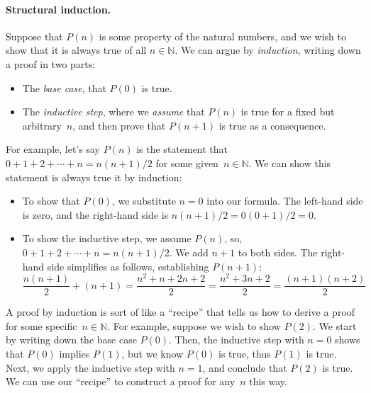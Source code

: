 \documentclass[../generics]{subfiles}
\begin{document}
\paragraph{Structural induction.} Suppose that $P(n)$ is some property of the natural numbers, and we wish to show that it is always true of all $n\in\mathbb{N}$. We can argue by \emph{induction}, writing down a proof in two parts:
\begin{itemize}
\item The \emph{base case}, that $P(0)$ is true.
\item The \emph{inductive step}, where we \emph{assume} that $P(n)$ is true for a fixed but arbitrary~$n$, and then prove that $P(n+1)$ is true as a consequence.
\end{itemize}
For example, let's say $P(n)$ is the statement that $0+1+2+\cdots+n=n(n+1)/2$ for some given~$n\in\mathbb{N}$. We can show this statement is always true it by induction:
\begin{itemize}
\item To show that $P(0)$, we substitute $n=0$ into our formula. The left-hand side is zero, and the right-hand side is $n(n+1)/2=0(0+1)/2=0$.
\item To show the inductive step, we assume $P(n)$, so, $0+1+2+\cdots+n=n(n+1)/2$. We add $n+1$ to both sides. The right-hand side simplifies as follows, establishing $P(n+1)$:
\[\frac{n(n+1)}{2}+(n+1)=\frac{n^2+n+2n+2}{2}=\frac{n^2+3n+2}{2}=\frac{(n+1)(n+2)}{2}\]
\end{itemize}
A proof by induction is sort of like a ``recipe'' that tells us how to derive a proof for some specific~$n\in\mathbb{N}$. For example, suppose we wish to show $P(2)$. We start by writing down the base case $P(0)$. Then, the inductive step with $n=0$ shows that $P(0)$ implies $P(1)$, but we know $P(0)$ is true, thus $P(1)$ is true. Next, we apply the inductive step with $n=1$, and conclude that $P(2)$ is true. We can use our ``recipe'' to construct a proof for any~$n$ this way.
\end{document}
